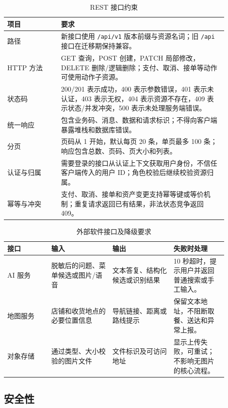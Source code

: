 \begin{longtable}{|L{0.22\linewidth}|L{0.68\linewidth}|}
\caption{REST 接口约束}\label{tab:rest-constraints}\\ \hline
\textbf{项目} & \textbf{要求} \\ \hline
路径 & 新接口使用 \texttt{/api/v1} 版本前缀与资源名词；旧 \texttt{/api} 接口在迁移期保持兼容。 \\ \hline
HTTP 方法 & GET 查询，POST 创建，PATCH 局部修改，DELETE 删除/逻辑删除；支付、取消、接单等动作可使用动作子资源。 \\ \hline
状态码 & 200/201 表示成功，400 表示参数错误，401 表示未认证，403 表示无权，404 表示资源不存在，409 表示状态/并发冲突，500 表示未处理服务端错误。 \\ \hline
统一响应 & 包含业务码、消息、数据和请求标识；不得向客户端暴露堆栈和数据库错误。 \\ \hline
分页 & 页码从 1 开始，默认每页 20 条，单页最多 100 条；响应包含总数、页码、页大小和列表。 \\ \hline
认证与归属 & 需要登录的接口从认证上下文获取用户身份，不信任客户端传入的用户 ID；角色校验后继续校验资源归属。 \\ \hline
幂等与冲突 & 支付、取消、接单和资产变更支持幂等键或等价机制；重复请求返回已有结果，非法状态竞争返回 409。 \\ \hline
\end{longtable}

\begin{longtable}{|L{0.18\linewidth}|L{0.25\linewidth}|L{0.25\linewidth}|L{0.22\linewidth}|}
\caption{外部软件接口及降级要求}\label{tab:external-interfaces}\\ \hline
\textbf{接口} & \textbf{输入} & \textbf{输出} & \textbf{失败时处理} \\ \hline
AI 服务 & 脱敏后的问题、菜单候选或图片/语音 & 文本答复、结构化候选或识别结果 & 10 秒超时，提示用户并返回普通搜索或手工输入。 \\ \hline
地图服务 & 店铺和收货地点的必要位置信息 & 导航链接、距离或路线提示 & 保留文本地址，不阻断取餐、送达和异常上报。 \\ \hline
对象存储 & 通过类型、大小校验的图片文件 & 文件标识及可访问地址 & 显示上传失败，可重试；不影响无图片的核心流程。 \\ \hline
\end{longtable}

\subsection{安全性}

